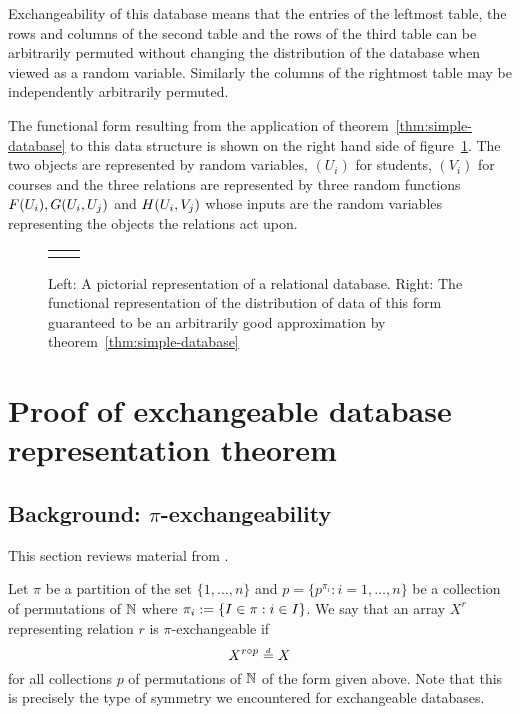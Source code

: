 Exchangeability of this database means that the entries of the leftmost table, the rows and columns of the second table and the rows of the third table can be arbitrarily permuted without changing the distribution of the database when viewed as a random variable.
Similarly the columns of the rightmost table may be independently arbitrarily permuted.

The functional form resulting from the application of theorem~\ref{thm:simple-database} to this data structure is shown on the right hand side of figure~\ref{fig:multi-rel-seq}.
The two objects are represented by \iid random variables, $(U_i)$ for students, $(V_i)$ for courses and the three relations are represented by three random functions $F(U_i),G(U_i,U_j)$ and $H(U_i,V_j)$ whose inputs are the random variables representing the objects the relations act upon.

\begin{figure}[ht]
\centering
\begin{tabular}{cc}
\tiny  & \tiny 
\end{tabular}
\caption{Left: A pictorial representation of a relational database. Right: The functional representation of the distribution of data of this form guaranteed to be an arbitrarily good approximation by theorem~\ref{thm:simple-database}}
\label{fig:multi-rel-seq}
\end{figure}

\section{Proof of exchangeable database representation theorem}
\label{sec:proof_database}

\subsection{Background: $\pi$-exchangeability}

This section reviews material from .

Let $\pi$ be a partition of the set $\{1,\dots,n\}$ and $p = \{p^{\pi_i} : i = 1,\dots,n\}$ be a collection of permutations of $\mathbb{N}$ where $\pi_i := \{I \in \pi : i \in I\}$.
We say that an array $X^r$ representing relation $r$ is $\pi$-exchangeable if 
\begin{equation}
  X^{r\circ p} \overset{\,_{\!d}}{=} X
\end{equation}
for all collections $p$ of permutations of $\mathbb{N}$ of the form given above.
Note that this is precisely the type of symmetry we encountered for exchangeable databases.

